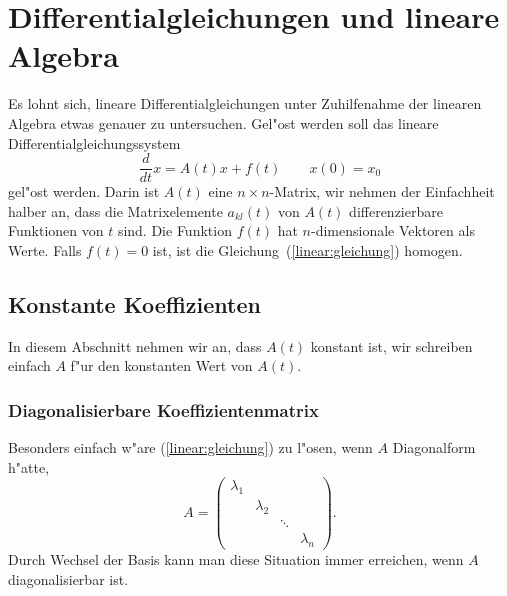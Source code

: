 %
%
%
\chapter{Differentialgleichungen und lineare Algebra\label{chapter:linear}}
\rhead{}
Es lohnt sich, lineare Differentialgleichungen unter Zuhilfenahme
der linearen Algebra etwas genauer zu untersuchen.
Gel"ost werden soll das lineare Differentialgleichungssystem
\begin{equation}
\frac{d}{dt}x = A(t)x + f(t)\qquad x(0)=x_0
\label{linear:gleichung}
\end{equation}
gel"ost werden.
Darin ist $A(t)$ eine $n\times n$-Matrix, wir nehmen der Einfachheit
halber an, dass die Matrixelemente $a_{kl}(t)$ von $A(t)$ differenzierbare
Funktionen von $t$ sind.
Die Funktion $f(t)$ hat $n$-dimensionale Vektoren als Werte.
Falls $f(t)=0$ ist, ist die Gleichung~(\ref{linear:gleichung}) 
homogen.

\section{Konstante Koeffizienten}
In diesem Abschnitt nehmen wir an, dass $A(t)$ konstant ist, wir schreiben
einfach $A$ f"ur den konstanten Wert von $A(t)$.
\subsection{Diagonalisierbare Koeffizientenmatrix}
Besonders einfach w"are (\ref{linear:gleichung}) zu l"osen, wenn $A$
Diagonalform h"atte,
\[
A=\begin{pmatrix}
\lambda_1&         &      &         \\
         &\lambda_2&      &         \\
         &         &\ddots&         \\
         &         &      &\lambda_n
\end{pmatrix}.
\]
Durch Wechsel der Basis kann man diese Situation immer erreichen, wenn
$A$ diagonalisierbar ist.

